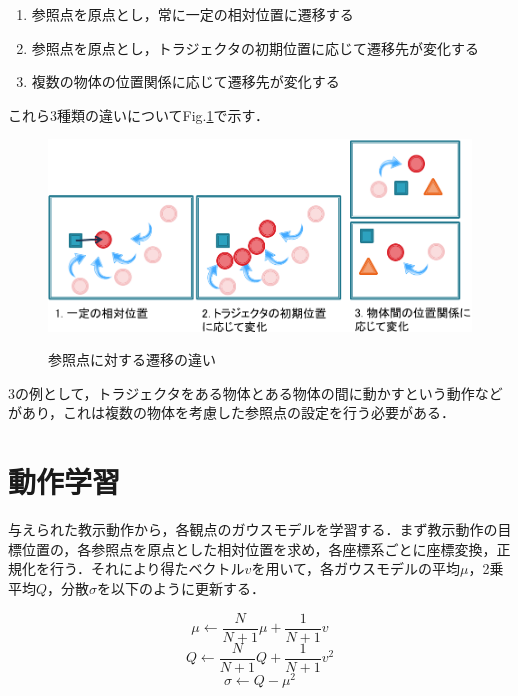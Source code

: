 	\begin{enumerate}
		\item 参照点を原点とし，常に一定の相対位置に遷移する
		\item 参照点を原点とし，トラジェクタの初期位置に応じて遷移先が変化する
		\item 複数の物体の位置関係に応じて遷移先が変化する
	\end{enumerate}
これら3種類の違いについてFig.\ref{figure:difference_displacement}で示す．
	\begin{figure}[t]
		\begin{center}
			\includegraphics[width=14cm]{figure2.png} \\ %
			\caption{参照点に対する遷移の違い}
			\label{figure:difference_displacement}
		\end{center}
	\end{figure}

3の例として，トラジェクタをある物体とある物体の間に動かすという動作などがあり，これは複数の物体を考慮した参照点の設定を行う必要がある．

\section{動作学習}

与えられた教示動作から，各観点のガウスモデルを学習する．まず教示動作の目標位置の，各参照点を原点とした相対位置を求め，各座標系ごとに座標変換，正規化を行う．それにより得たベクトル$v$を用いて，各ガウスモデルの平均$μ$，2乗平均$Q$，分散$σ$を以下のように更新する．

\[
	μ  \leftarrow \frac{N}{N+1}μ+\frac{1}{N+1}v
\]
\[
	Q  \leftarrow \frac{N}{N+1}Q+\frac{1}{N+1}v^2	
\]
\[
	σ  \leftarrow Q - μ^2
\]

